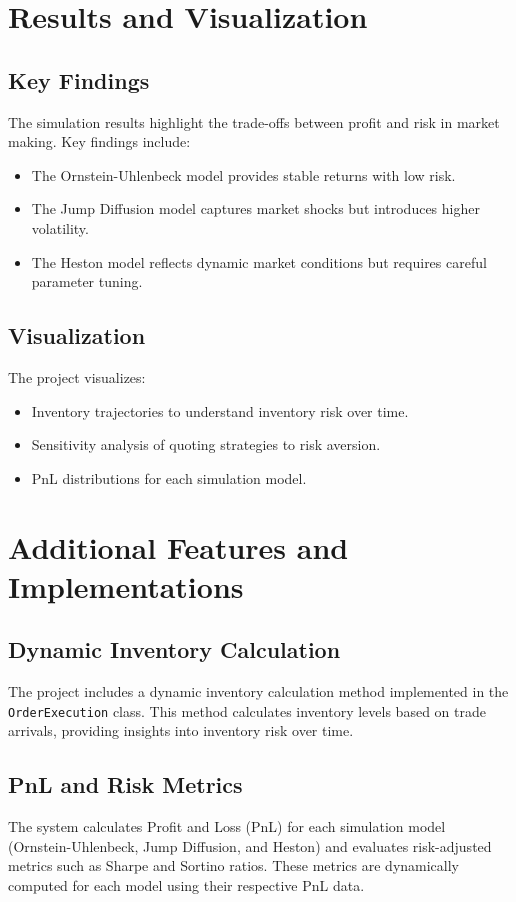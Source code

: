 \documentclass{beamer}
\begin{document}
\section{Results and Visualization}
\subsection{Key Findings}
The simulation results highlight the trade-offs between profit and risk in market making. Key findings include:
\begin{itemize}
    \item The Ornstein-Uhlenbeck model provides stable returns with low risk.
    \item The Jump Diffusion model captures market shocks but introduces higher volatility.
    \item The Heston model reflects dynamic market conditions but requires careful parameter tuning.
\end{itemize}

\subsection{Visualization}
The project visualizes:
\begin{itemize}
    \item Inventory trajectories to understand inventory risk over time.
    \item Sensitivity analysis of quoting strategies to risk aversion.
    \item PnL distributions for each simulation model.
\end{itemize}

\section{Additional Features and Implementations}
\subsection{Dynamic Inventory Calculation}
The project includes a dynamic inventory calculation method implemented in the \texttt{OrderExecution} class. This method calculates inventory levels based on trade arrivals, providing insights into inventory risk over time.

\subsection{PnL and Risk Metrics}
The system calculates Profit and Loss (PnL) for each simulation model (Ornstein-Uhlenbeck, Jump Diffusion, and Heston) and evaluates risk-adjusted metrics such as Sharpe and Sortino ratios. These metrics are dynamically computed for each model using their respective PnL data.
\end{document}
